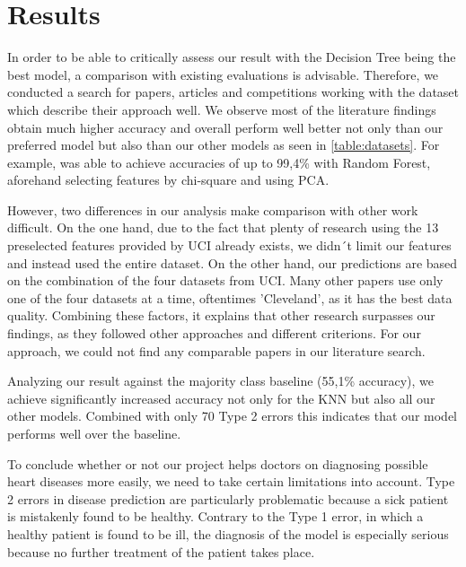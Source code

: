 
\section{Results} \label{sec:results}

In order to be able to critically assess our result with the Decision Tree being the best model, a comparison with existing evaluations is advisable. Therefore, we conducted a search for papers, articles and competitions working with the dataset which describe their approach well. We observe most of the literature findings obtain much higher accuracy \citep{alotaibi2019, garate-escamila2020, uyar2017} and overall perform well better not only than our preferred model but also than our other models as seen in \cref{table:datasets}. For example, \citet{garate-escamila2020} was able to achieve accuracies of up to 99,4\% with Random Forest, aforehand selecting features by chi-square and using PCA.  

However, two differences in our analysis make comparison with other work difficult. On the one hand, due to the fact that plenty of research using the 13 preselected features provided by UCI already exists, we didn´t limit our features and instead used the entire dataset. On the other hand, our predictions are based on the combination of the four datasets from UCI. Many other papers use only one of the four datasets at a time, oftentimes 'Cleveland', as it has the best data quality. Combining these factors, it explains that other research surpasses our findings, as they followed other approaches and different criterions. For our approach, we could not find any comparable papers in our literature search. 

Analyzing our result against the majority class baseline (55,1\% accuracy), we achieve significantly increased accuracy not only for the KNN but also all our other models. Combined with only 70 Type 2 errors this indicates that our model performs well over the baseline. 

To conclude whether or not our project helps doctors on diagnosing possible heart diseases more easily, we need to take certain limitations into account. Type 2 errors in disease prediction are particularly problematic because a sick patient is mistakenly found to be healthy. Contrary to the Type 1 error, in which a healthy patient is found to be ill, the diagnosis of the model is especially serious because no further treatment of the patient takes place.  

